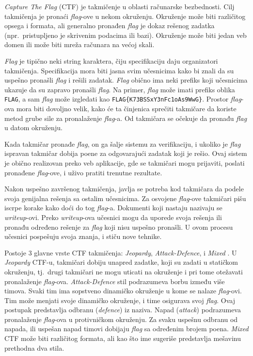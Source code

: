 \documentclass[12pt, a4paper, twocolumn]{article}
\begin{document}
\emph{Capture The Flag} (CTF) je takmičenje u oblasti računarske bezbednosti.
Cilj takmičenja je pronaći \emph{flag}-ove u nekom okruženju. Okruženje može
biti različitog opsega i formata, ali generalno pronađen \emph{flag} je dokaz
rešenog zadatka (npr.\ pristupljeno je skrivenim podacima ili bazi). Okruženje 
može biti jedan veb domen ili može biti mreža računara na većoj skali.

\emph{Flag} je tipično neki string karaktera, čiju specifikaciju daju
organizatori takmičenja. Specifikacija mora biti jasna svim učesnicima kako 
bi znali da su uspešno pronašli \emph{flag} i rešili zadatak. \emph{Flag}
obično ima neki prefiks koji učesnicima ukazuje da su zapravo pronašli 
\emph{flag}. Na primer, \emph{flag} može imati prefiks oblika \texttt{FLAG},
a sam \emph{flag} može izgledati kao \texttt{FLAG\{K73BSSxY3nFc1oAs9WwG\}}.
Prostor \emph{flag}-ova mora biti dovoljno velik, kako će ta činjenica 
sprečiti takmičare da koriste metod grube sile za pronalaženje \emph{flag}-a. 
Od takmičara se očekuje da pronađu \emph{flag} u datom okruženju.

Kada takmičar pronađe \emph{flag}, on ga šalje sistemu za verifikaciju, 
i ukoliko je \emph{flag} ispravan takmičar dobija poene za odgovarajući 
zadatak koji je rešio. Ovaj sistem je obično realizovan preko veb aplikacije, 
gde se takmičari mogu prijaviti, poslati pronađene \emph{flag}-ove, i uživo 
pratiti trenutne rezultate.

Nakon uspešno završenog takmičenja, javlja se potreba kod takmičara da podele
svoja genijalna rešenja sa ostalim učesnicima. Za osvojene \emph{flag}-ove
takmičari pišu iscrpe korake kako doći do tog \emph{flag}-a. Dokumenti koji 
nastaju nazivaju se \emph{writeup}-ovi. Preko \emph{writeup}-ova učesnici mogu 
da uporede svoja rešenja ili pronađu određeno rešenje za \emph{flag} koji 
nisu uspešno pronašli. U ovom procesu učesnici pospešuju svoja znanja, 
i stiču nove tehnike.

Postoje 3 glavne vrste CTF takmičenja: \emph{Jeopardy}, \emph{Attack-Defence},
i \emph{Mixed} \cite{ctf_time}. U \emph{Jeopardy} CTF-u, takmičari dobiju 
unapred zadatke, koji su zadati u statičkom okruženju, tj.\ drugi takmičari 
ne mogu uticati na okruženje i pri tome otežavati pronalaženje \emph{flag}-ova. 
\emph{Attack-Defence} stil podrazumeva borbu između više timova. Svaki tim 
ima sopstveno dinamičko okruženje u kome se nalaze \emph{flag}-ovi. Tim 
može menjati svoje dinamičko okruženje, i time osigurava svoj \emph{flag}. 
Ovaj postupak predstavlja odbranu (\emph{defence}) iz naziva. Napad 
(\emph{attack}) podrazumeva pronalaženje \emph{flag}-ova u protivničkom 
okruženju. Za svaku uspešnu odbranu od napada, ili uspešan napad timovi 
dobijaju \emph{flag} sa određenim brojem poena. \emph{Mixed} CTF može biti 
različitog formata, ali kao što ime sugeriše predstavlja mešavinu prethodna 
dva stila.
\end{document}
